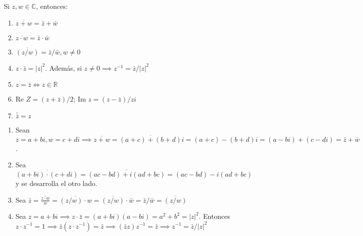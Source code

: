 \begin{prop}
    Si $z,w\in\mathbb{C}$, entonces: 
    \begin{enumerate}
        \item $\overline{z+w}=\bar{z}+\bar{w}$
        \item $\overline{z\cdot w}=\bar{z}\cdot\bar{w}$
        \item $\overline{(z/w)}=\bar{z}/\bar{w},w\neq 0$
        \item $z\cdot\bar{z}=|z|^2$. Además, si $z\neq 0\implies z^{-1}=\bar{z}/|z|^2$
        \item $z=\bar{z}\iff z\in\mathbb{R}$
        \item Re $Z= (z+\bar{z})/2$; Im $z=(z-\bar{z})/zi$
        \item $\bar{\bar{z}}=z$
    \end{enumerate}
    \begin{dem}
        \begin{enumerate}
            \item Sean $z=a+bi,w=c+di\implies \overline{z+w}=\overline{(a+c)+(b+d)}i=(a+c)-(b+d)i=(a-bi)+(c-di)=\bar{z}+\bar{w}$.
            \item Sea $\overline{(a+bi)\cdot (c+di)}=\overline{(ac-bd)+i(ad+bc)}=(ac-bd)-i(ad+bc)$ y se desarrolla el otro lado.
            \item Sea $\bar{z}=\overline{\frac{z\cdot w}{w}}=\overline{(z/w)\cdot w}=\overline{(z/w)}\cdot\bar{w} = \bar{z}/\bar{w}=\overline{(z/w)}$
            \item Sea $z=a+bi\implies z\cdot\bar{z}=(a+bi)(a-bi)=a^2+b^2=|z|^2$. Entonces 
            $z\cdot z^{-1}=1\implies \bar{z}(z\cdot z^{-1})=\bar{z}\implies (\bar{z}z)z^{-1}=\bar{z}\implies z^{-1}=\bar{z}/|z|^2$

        \end{enumerate}
    \end{dem}
\end{prop}

